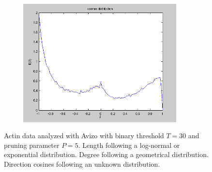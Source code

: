 \begin{figure}[H]
\begin{subfigure}{0.5\textwidth}
    \includegraphics[width=0.92\textwidth]{Figures/chapter-image/avizo/ActinZ39b21l5-histo-cosines.png}
    \label{avizo305-cosines}
  \end{subfigure}

  \caption[Distributions of length, degree, and cosines with Avizo for
  actin with T=30,P=5]{Actin data analyzed with Avizo with binary threshold
    $T=30$ and pruning parameter $P=5$.  Length following a
    log-normal or exponential distribution.  Degree
    following a geometrical distribution.   Direction
  cosines following an unknown distribution.}
  \label{fig:avizo_histograms30}
\end{figure}

